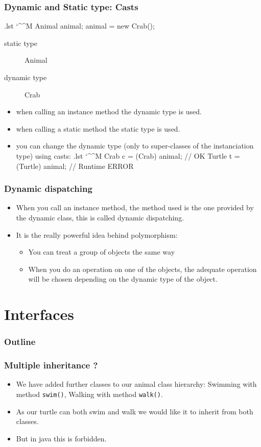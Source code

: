 \documentclass[10pt,handout]{beamer}
\makeatletter
\newenvironment{code}{%
  \begingroup
  \@bsphack
  \immediate\openout\lstvrb@out\jobname.lst
  \let\do\@makeother\dospecials\catcode`\^^M\active
  \def\verbatim@processline{%
    \immediate\write\lstvrb@out{\the\verbatim@line}}%
  \verbatim@start}{%
  \immediate\closeout\lstvrb@out
  \@esphack
  \endgroup
  
  \begin{alertblock}{}
    
  \end{alertblock}}
\makeatother
\begin{document}
\begin{frame}[fragile]
\frametitle{Dynamic and Static type: Casts}
\begin{code}
  Animal animal;
  animal = new Crab();  
\end{code}
\begin{description}
\item[static type] Animal
\item[dynamic type] Crab
\end{description}
\begin{itemize}
  \item when calling an instance method the dynamic type is used.
  \item when calling a static method the static type is used.
  \item you can change the dynamic type (only to super-classes of the instanciation type) using casts:
  \begin{code}
    Crab c = (Crab) animal; // OK
    Turtle t = (Turtle) animal; // Runtime ERROR
  \end{code}
\end{itemize}
\end{frame}

\begin{frame}[fragile]
\frametitle{Dynamic dispatching}
\begin{itemize}
  \item When you call an instance method, the method used is the one provided by the dynamic class,
        this is called \alert{dynamic dispatching}.
  \item It is the really powerful idea behind polymorphism: 
  \begin{itemize}
    \item You can treat a group of objects the same way
    \item When you do an operation on one of the objects, the adequate operation will be chosen depending on the
          dynamic type of the object.
  \end{itemize}
\end{itemize}
\end{frame}
\section{Interfaces}
\begin{frame}
  \frametitle{Outline}
  \tableofcontents[currentsection]
\end{frame}

\begin{frame}[fragile]
  \frametitle{Multiple inheritance ?}
  \begin{itemize}
    \item We have added further classes to our animal class hierarchy:
      Swimming with method \verb!swim()!, Walking with
      method \verb!walk()!.
     \item As our turtle can both swim and walk we would like it to
       inherit from both classes.
     \item But in java this is \alert{forbidden}.
  \end{itemize}
\end{frame}
\end{document}
